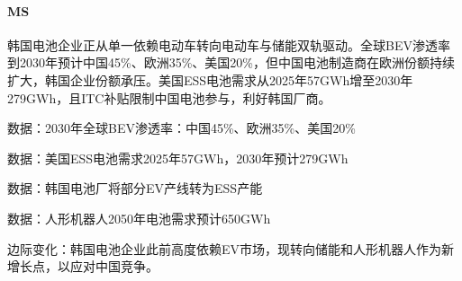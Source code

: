 \documentclass[11pt]{ctexart}
\begin{document}
\paragraph{MS} 韩国电池企业正从单一依赖电动车转向电动车与储能双轨驱动。全球BEV渗透率到2030年预计中国45\%、欧洲35\%、美国20\%，但中国电池制造商在欧洲份额持续扩大，韩国企业份额承压。美国ESS电池需求从2025年57GWh增至2030年279GWh，且ITC补贴限制中国电池参与，利好韩国厂商。
{\small\color{refgray}数据：2030年全球BEV渗透率：中国45\%、欧洲35\%、美国20\%\par}
{\small\color{refgray}数据：美国ESS电池需求2025年57GWh，2030年预计279GWh\par}
{\small\color{refgray}数据：韩国电池厂将部分EV产线转为ESS产能\par}
{\small\color{refgray}数据：人形机器人2050年电池需求预计650GWh\par}
{\small\color{refgray}边际变化：韩国电池企业此前高度依赖EV市场，现转向储能和人形机器人作为新增长点，以应对中国竞争。\par}
\end{document}
